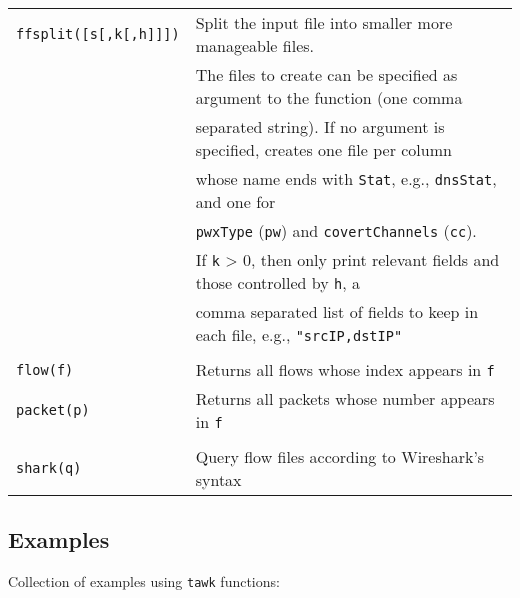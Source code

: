 \documentclass[documentation]{subfiles}
\begin{document}
\begin{longtable}{ll}
    {\tt ffsplit([s[,k[,h]]])} & Split the input file into smaller more manageable files.\\
                               & The files to create can be specified as argument to the function (one comma\\
                               & separated string). If no argument is specified, creates one file per column\\
                               & whose name ends with {\tt Stat}, e.g., {\tt dnsStat}, and one for \\
                               & {\tt pwxType} ({\tt pw}) and {\tt covertChannels} ({\tt cc}).\\
                               & If {\tt k} > 0, then only print relevant fields and those controlled by {\tt h}, a\\
                               & comma separated list of fields to keep in each file, e.g., {\tt "srcIP,dstIP"}\\\\

    {\tt flow(f)}   & Returns all flows whose index appears in {\tt f}\\
    {\tt packet(p)} & Returns all packets whose number appears in {\tt f}\\\\

    {\tt shark(q)}  & Query flow files according to Wireshark's syntax\\
    \bottomrule
\end{longtable}

\subsection{Examples}\label{examples.load}
Collection of examples using {\tt tawk} functions:
\end{document}
